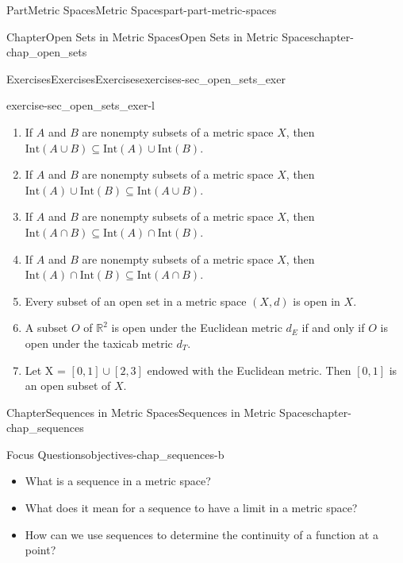 \documentclass[oneside,10pt,]{book}
\numberwithin{equation}{chapter}
\newcommand{\R}{\mathbb{R}}
\newcommand{\Int}{\text{Int}}
\begin{document}
\begin{partptx}{Part}{Metric Spaces}{}{Metric Spaces}{}{}{part-part-metric-spaces}
\begin{chapterptx}{Chapter}{Open Sets in Metric Spaces}{}{Open Sets in Metric Spaces}{}{}{chapter-chap_open_sets}
\begin{exercises-section}{Exercises}{Exercises}{}{Exercises}{}{}{exercises-sec_open_sets_exer}
\begin{divisionexercise}{12}{}{}{exercise-sec_open_sets_exer-l}
\begin{enumerate}[font=\bfseries,label=(\alph*),ref=\alph*]%
\item{}If \(A\) and \(B\) are nonempty subsets of a metric space \(X\), then \(\Int(A \cup B) \subseteq \Int(A) \cup \Int(B)\).%
\item{}If \(A\) and \(B\) are nonempty subsets of a metric space \(X\), then \(\Int(A) \cup \Int(B) \subseteq \Int(A \cup B)\).%
\item{}If \(A\) and \(B\) are nonempty subsets of a metric space \(X\), then \(\Int(A \cap B) \subseteq \Int(A) \cap \Int(B)\).%
\item{}If \(A\) and \(B\) are nonempty subsets of a metric space \(X\), then \(\Int(A) \cap \Int(B) \subseteq \Int(A \cap B)\).%
\item{}Every subset of an open set in a metric space \((X,d)\) is open in \(X\).%
\item{}A subset \(O\) of \(\R^2\) is open under the Euclidean metric \(d_E\) if and only if \(O\) is open under the taxicab metric \(d_T\).%
\item{}Let X = \([0,1] \cup [2,3]\) endowed with the Euclidean metric. Then \([0, 1]\) is an open subset of \(X\).%
\end{enumerate}%
\end{divisionexercise}%
\end{exercises-section}
\end{chapterptx}
%
\typeout{************************************************}
\typeout{************************************************}
%
\begin{chapterptx}{Chapter}{Sequences in Metric Spaces}{}{Sequences in Metric Spaces}{}{}{chapter-chap_sequences}
\renewcommand*{\chaptername}{Chapter}
\begin{objectives}{Focus Questions}{objectives-chap_sequences-b}
%
\begin{itemize}[label=\textbullet]
\item{}What is a sequence in a metric space?%
\item{}What does it mean for a sequence to have a limit in a metric space?%
\item{}How can we use sequences to determine the continuity of a function at a point?%
\end{itemize}
\end{objectives}
%
%
\typeout{************************************************}
\typeout{************************************************}

\end{chapterptx}
\end{partptx}
\end{document}
